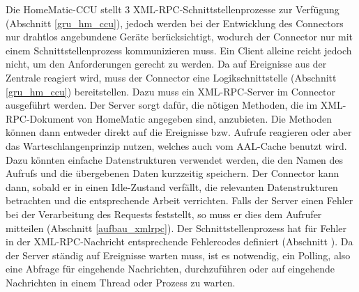 Die HomeMatic-CCU stellt 3 XML-RPC-Schnittstellenprozesse zur Verfügung (Abschnitt \ref{gru_hm_ccu}), jedoch werden
bei der Entwicklung des Connectors nur drahtlos angebundene Geräte berücksichtigt, wodurch der Connector
nur mit einem Schnittstellenprozess kommunizieren muss.
Ein Client alleine reicht jedoch nicht, um den Anforderungen gerecht zu werden.
Da auf Ereignisse aus der Zentrale reagiert wird, muss der Connector eine Logikschnittstelle (Abschnitt \ref{gru_hm_ccu})
bereitstellen.
Dazu muss ein XML-RPC-Server im Connector ausgeführt werden.
Der Server sorgt dafür, die nötigen Methoden, die im XML-RPC-Dokument von HomeMatic \cite{homematic_xmlrpc} angegeben sind,
anzubieten.
Die Methoden können dann entweder direkt auf die Ereignisse bzw. Aufrufe reagieren oder aber das Warteschlangenprinzip
nutzen, welches auch vom AAL-Cache benutzt wird.
Dazu könnten einfache Datenstrukturen verwendet werden, die den Namen des Aufrufs und die übergebenen Daten kurzzeitig
speichern.
Der Connector kann dann, sobald er in einen Idle-Zustand verfällt, die relevanten Datenstrukturen betrachten und
die entsprechende Arbeit verrichten.
Falls der Server einen Fehler bei der Verarbeitung des Requests feststellt, so muss er dies dem Aufrufer mitteilen
(Abschnitt \ref{aufbau_xmlrpc}).
Der Schnittstellenprozess hat für Fehler in der XML-RPC-Nachricht entsprechende Fehlercodes definiert (Abschnitt \cite{homematic_xmlrpc}).
Da der Server ständig auf Ereignisse warten muss, ist es notwendig, ein Polling, also eine Abfrage für eingehende
Nachrichten, durchzuführen oder auf eingehende Nachrichten in einem Thread oder Prozess zu warten.

